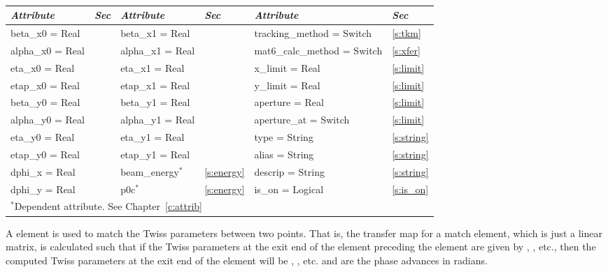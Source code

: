 {{\begin{center}
\tt
\begin{tabular}{|l|l||l|l||l|l|} \hline
  {\sl Attribute} & {\sl Sec}  & {\sl Attribute} & {\sl Sec} & {\sl Attribute} & {\sl Sec} \\ \hline
  beta\_x0  = Real &               & beta\_x1  = Real &                & tracking\_method = Switch   & \ref{s:tkm}    \\ \hline
  alpha\_x0 = Real &               & alpha\_x1 = Real &                & mat6\_calc\_method = Switch & \ref{s:xfer}   \\ \hline
  eta\_x0   = Real &               & eta\_x1   = Real &                & x\_limit = Real             & \ref{s:limit}  \\ \hline
  etap\_x0  = Real &               & etap\_x1  = Real &                & y\_limit = Real             & \ref{s:limit}  \\ \hline
  beta\_y0  = Real &               & beta\_y1  = Real &                & aperture = Real             & \ref{s:limit}  \\ \hline
  alpha\_y0 = Real &               & alpha\_y1 = Real &                & aperture\_at = Switch       & \ref{s:limit}  \\ \hline
  eta\_y0   = Real &               & eta\_y1   = Real &                & type = String               & \ref{s:string} \\ \hline
  etap\_y0  = Real &               & etap\_y1  = Real &                & alias = String              & \ref{s:string} \\ \hline
  dphi\_x   = Real &               & beam\_energy$^*$ & \ref{s:energy} & descrip = String            & \ref{s:string} \\ \hline
  dphi\_y   = Real &               & p0c$^*$          & \ref{s:energy} & is\_on = Logical            & \ref{s:is_on}  \\ \hline
  \multicolumn{6}{l}{\small $^*$Dependent attribute. See Chapter~\ref{c:attrib}} \\
\end{tabular}
\end{center}
\toffset

A  element is used to match the Twiss parameters between two points. That is, 
the transfer map for a match element, which is just a linear matrix, is calculated such that
if the Twiss parameters at the exit end of the element preceding the  element are 
given by , , etc., then the computed Twiss parameters at the exit
end of the  element will be , , etc.  and 
are the phase advances in radians.

}}

